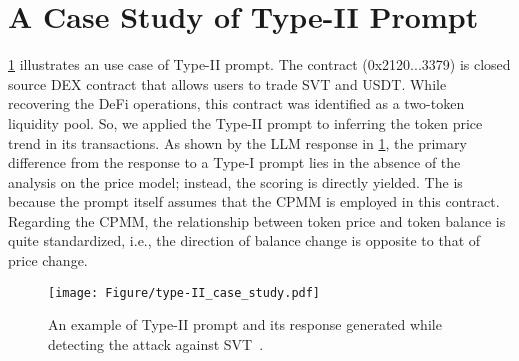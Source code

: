 \section{A Case Study of Type-II Prompt}
\label{sec:case_study_type_II_prompt}

\myfig\ref{fig:type-II_case_study} illustrates an use case of Type-II prompt. 
The contract (0x2120...3379) is closed source DEX contract that allows users to trade SVT and USDT. 
While recovering the DeFi operations, this contract was identified as a two-token liquidity pool. So, we applied the Type-II prompt to inferring the token price trend in its transactions. 
As shown by the LLM response in \myfig\ref{fig:type-II_case_study}, the primary difference from the response to a Type-I prompt lies in the absence of the analysis on the price model; instead, the scoring is directly yielded. 
The is because the prompt itself assumes that the CPMM is employed in this contract. 
Regarding the CPMM, the relationship between token price and token balance is quite standardized, i.e., the direction of balance change is opposite to that of price change.

\begin{figure}[!t]
    \centering
    \texttt{[image: Figure/type-II\_case\_study.pdf]}
    \caption{An example of Type-II prompt and its response generated while detecting the attack against SVT~\cite{SVT}.}
    \label{fig:type-II_case_study}
\end{figure}





